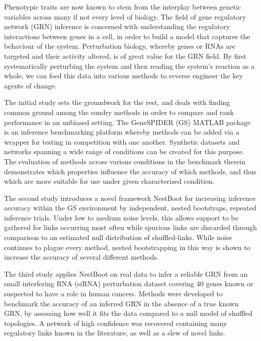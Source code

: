 
\begin{abstracts}

Phenotypic traits are now known to stem from the interplay between genetic variables across many if not every level of biology. The field of gene regulatory network (GRN) inference is concerned with understanding the regulatory interactions between genes in a cell, in order to build a model that captures the behaviour of the system. Perturbation biology, whereby genes or RNAs are targeted and their activity altered, is of great value for the GRN field. By first systematically perturbing the system and then reading the system's reaction as a whole, we can feed this data into various methods to reverse engineer the key agents of change. 

The initial study sets the groundwork for the rest, and deals with finding common ground among the sundry methods in order to compare and rank performance in an unbiased setting. The GeneSPIDER (GS) MATLAB package is an inference benchmarking platform whereby methods can be added via a wrapper for testing in competition with one another. Synthetic datasets and networks spanning a wide range of conditions can be created for this purpose. The evaluation of methods across various conditions in the benchmark therein demonstrates which properties influence the accuracy of which methods, and thus which are more suitable for use under given characterized condition.

The second study introduces a novel framework NestBoot for increasing inference accuracy within the GS environment by independent, nested bootstraps, \ie repeated inference trials. Under low to medium noise levels, this allows support to be gathered for links occurring most often while spurious links are discarded through comparison to an estimated null distribution of shuffled-links. While noise continues to plague every method, nested bootstrapping in this way is shown to increase the accuracy of several different methods.

The third study applies NestBoot on real data to infer a reliable GRN from an small interfering RNA (siRNA) perturbation dataset covering 40 genes known or suspected to have a role in human cancers. Methods were developed to benchmark the accuracy of an inferred GRN in the absence of a true known GRN, by assessing how well it fits the data compared to a null model of shuffled topologies. A network of high confidence was recovered containing many regulatory links known in the literature, as well as a slew of novel links.


\end{abstracts}

